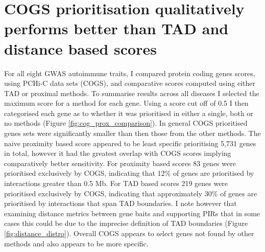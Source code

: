 \documentclass[a4paper,11pt]{report}
\begin{document}
\section{COGS prioritisation qualitatively performs better than TAD and distance based scores}
For all eight GWAS autoimmune traits, I compared protein coding genes scores, using PCHi-C data sets (COGS), and comparative scores computed using either TAD or proximal methods. To summarise results across all diseases I selected the maximum score for a method for each gene. Using a score cut off of 0.5 I then categorised each gene as to whether it was prioritised in either a single, both or no methods (Figure \ref{fig:cog_prox_comparison}). In general COGS prioritised genes sets were significantly smaller than then those from the other methods. The naive proximity based score appeared to be least specific prioritising 5,731 genes in total, however it had the greatest overlap with COGS scores implying comparatively better sensitivity. For proximity based scores 83 genes were prioritised exclusively by COGS, indicating that 12\% of genes are prioritised by interactions greater than 0.5 Mb. For TAD based scores 219 genes were prioritised exclusively by COGS, indicating that approximately 30\% of genes are prioritised by interactions that span TAD boundaries.  I note however that examining distance metrics between gene baits and supporting PIRs that in some cases this could be due to the imprecise definition of TAD boundaries (Figure \ref{fig:distance_distro}). Overall COGS appears to select genes not found by other methods and also appears to be more specific.
\end{document}
